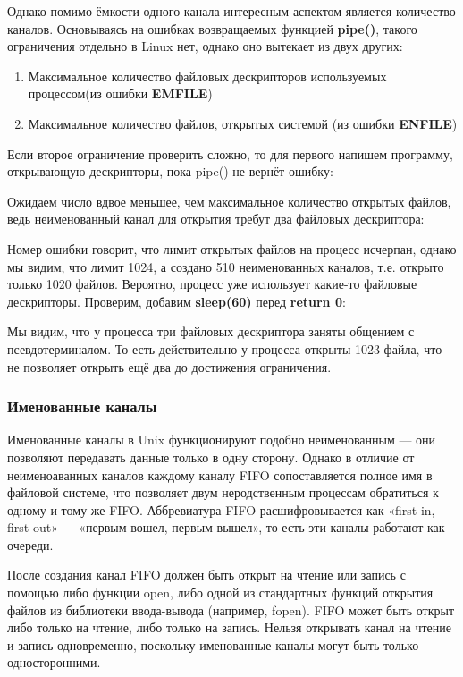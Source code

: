 \documentclass[a4paper]{article}
\begin{document}
	Однако помимо ёмкости одного канала интересным аспектом является количество каналов. Основываясь на ошибках возвращаемых функцией \textbf{pipe()}, такого ограничения отдельно в Linux нет, однако оно вытекает из двух других:
\begin{enumerate}
	\item Максимальное количество файловых дескрипторов используемых процессом(из ошибки \textbf{EMFILE})
	\item Максимальное количество файлов, открытых системой (из ошибки \textbf{ENFILE})
\end{enumerate}
	Если второе ограничение проверить сложно, то для первого напишем программу, открывающую дескрипторы, пока pipe() не вернёт ошибку:
	
	
	Ожидаем число вдвое меньшее, чем максимальное количество открытых файлов, ведь неименованный канал для открытия требут два файловых дескриптора:
	
	Номер ошибки говорит, что лимит открытых файлов на процесс исчерпан, однако мы видим, что лимит 1024, а создано 510 неименованных каналов, т.е. открыто только 1020 файлов. Вероятно, процесс уже использует какие-то файловые дескрипторы. Проверим, добавим \textbf{sleep(60)} перед \textbf{return 0}:
	
	Мы видим, что у процесса три файловых дескриптора заняты общением с псевдотерминалом. То есть действительно у процесса открыты 1023 файла, что не позволяет открыть ещё два до достижения ограничения.
	
	\subsubsection{Именованные каналы}
	Именованные каналы в Unix функционируют подобно неименованным — они позволяют передавать данные только в одну сторону. Однако в отличие от неименоаванных каналов каждому каналу FIFO сопоставляется полное имя в файловой системе, что позволяет двум неродственным процессам обратиться к одному и тому же FIFO. Аббревиатура FIFO расшифровывается как «first in, first out» — «первым вошел, первым вышел», то есть эти каналы работают как очереди.
	
	После создания канал FIFO должен быть открыт на чтение или запись с помощью либо функции open, либо одной из стандартных функций открытия файлов из библиотеки ввода-вывода (например, fopen). FIFO может быть открыт либо только на чтение, либо только на запись. Нельзя открывать канал на чтение и запись одновременно, поскольку именованные каналы могут быть только односторонними.
\end{document}
